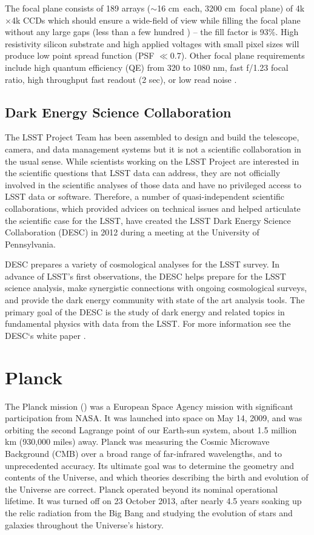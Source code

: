 The focal plane consists of 189 arrays ($\sim$16 cm\sq\ each, 3200 cm\sq\ focal plane) of 4k$\times$4k CCDs which should ensure a wide-field of view while filling the focal plane without any large gaps (less than a few hundred \um) -- the fill factor is 93\%. High resistivity silicon substrate and high applied voltages with small pixel sizes will produce low point spread function (PSF $\ll0.7$\arcsec). Other focal plane requirements include high quantum efficiency (QE) from 320 to 1080 nm, fast f/1.23 focal ratio, high throughput fast readout (2 sec), or low read noise \parencite{2017JInst..12C3017A}.


\subsection{Dark Energy Science Collaboration}
The LSST Project Team has been assembled to design and build the telescope, camera, and data management systems but it is not a scientific collaboration in the usual sense. While scientists working on the LSST Project are interested in the scientific questions that LSST data can address, they are not officially involved in the scientific analyses of those data and have no privileged access to LSST data or software. Therefore, a number of quasi-independent scientific collaborations, which provided advices on technical issues and helped articulate the scientific case for the LSST, have created the LSST Dark Energy Science Collaboration (DESC) in 2012 during a meeting at the University of Pennsylvania.

DESC prepares a variety of cosmological analyses for the LSST survey. In advance of LSST's first observations, the DESC helps prepare for the LSST science analysis, make synergistic connections with ongoing cosmological surveys, and provide the dark energy community with state of the art analysis tools. The primary goal of the DESC is the study of dark energy and related topics in fundamental physics with data from the LSST. For more information see the DESC`s white paper \cite{desc_white}.

\section{Planck}
The Planck mission (\cite{planck}) was a European Space Agency mission with significant participation from NASA. It was launched into space on May 14, 2009, and was orbiting the second Lagrange point of our Earth-sun system, about 1.5 million km (930,000 miles) away. Planck was measuring the Cosmic Microwave Background (CMB) over a broad range of far-infrared wavelengths, and to unprecedented accuracy. Its ultimate goal was to determine the geometry and contents of the Universe, and which theories describing the birth and evolution of the Universe are correct. Planck operated beyond its nominal operational lifetime. It was turned off on 23 October 2013, after nearly 4.5 years soaking up the relic radiation from the Big Bang and studying the evolution of stars and galaxies throughout the Universe's history.

